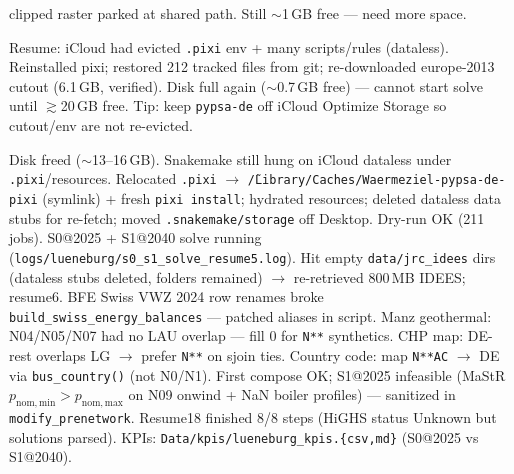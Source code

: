 \documentclass[11pt,a4paper]{article}
\begin{document}
\begin{description}[style=nextline,leftmargin=1.2cm]
        clipped raster parked at shared path. Still $\sim$1\,GB free --- need more space.
  \item[2026-11-12] Resume: iCloud had evicted \texttt{.pixi} env + many
        scripts/rules (dataless). Reinstalled pixi; restored 212 tracked files
        from git; re-downloaded europe-2013 cutout (6.1\,GB, verified).
        Disk full again ($\sim$0.7\,GB free) --- cannot start solve until
        $\gtrsim$20\,GB free. Tip: keep \texttt{pypsa-de} off iCloud Optimize
        Storage so cutout/env are not re-evicted.
  \item[2026-11-13] Disk freed ($\sim$13--16\,GB). Snakemake still hung on
        iCloud dataless under \texttt{.pixi}/resources. Relocated
        \texttt{.pixi} $\to$ \texttt{\~/Library/Caches/Waermeziel-pypsa-de-pixi}
        (symlink) + fresh \texttt{pixi install}; hydrated resources; deleted
        dataless data stubs for re-fetch; moved
        \texttt{.snakemake/storage} off Desktop. Dry-run OK (211 jobs).
        S0@2025 + S1@2040 solve running
        (\texttt{logs/lueneburg/s0\_s1\_solve\_resume5.log}).
        Hit empty \texttt{data/jrc\_idees} dirs (dataless stubs deleted,
        folders remained) $\to$ re-retrieved 800\,MB IDEES; resume6.
        BFE Swiss VWZ 2024 row renames broke
        \texttt{build\_swiss\_energy\_balances} --- patched aliases in script.
        Manz geothermal: N04/N05/N07 had no LAU overlap --- fill 0 for
        \texttt{N**} synthetics. CHP map: DE-rest overlaps LG $\to$ prefer
        \texttt{N**} on sjoin ties.         Country code: map \texttt{N**AC}
        $\to$ DE via \texttt{bus\_country()} (not N0/N1).
        First compose OK; S1@2025 infeasible (MaStR $p_\mathrm{nom,min}>p_\mathrm{nom,max}$
        on N09 onwind + NaN boiler profiles) --- sanitized in
        \texttt{modify\_prenetwork}. Resume18 finished 8/8 steps
        (HiGHS status Unknown but solutions parsed).
        KPIs: \texttt{Data/kpis/lueneburg\_kpis.\{csv,md\}}
        (S0@2025 vs S1@2040).
\end{description}
\end{document}
